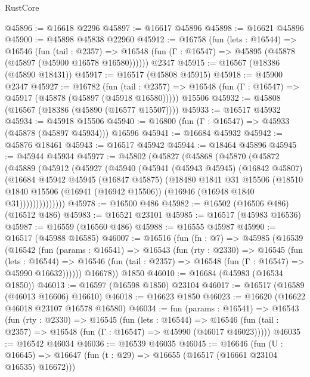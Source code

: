 \begin{lexlean}{RustCore}
\begin{coremodule}
@45896 := @16618 @2296
@45897 := @16617 @45896
@45898 := @16621 @45896
@45900 := @45898 @45838 @22960
@45912 := @16758
    (fun (lets : @16544) =>
    @16546
      (fun (tail : @2357) =>
      @16548 (fun (Γ : @16547) => @45895 (@45878 (@45897 (@45900 @16578 @16580))))))
    @2347
@45915 := @16567 (@18386 (@45890 @18431))
@45917 := @16517 (@45808 @45915)
@45918 := @45900 @2347
@45927 := @16782
    (fun (tail : @2357) => @16548 (fun (Γ : @16547) => @45917 (@45878 (@45897 (@45918 @16580)))))
    @15506
@45932 := @45808 (@16567 (@18386 (@45890 (@16577 @15507))))
@45933 := @16517 @45932
@45934 := @45918 @15506
@45940 := @16800 (fun (Γ : @16547) => @45933 (@45878 (@45897 @45934))) @16596
@45941 := @16684 @45932
@45942 := @45876 @18461
@45943 := @16517 @45942
@45944 := @18464 @45896
@45945 := @45944 @45934
@45977 := @45802
    (@45827
      (@45868
        (@45870
          (@45872
            (@45889
              (@45912
                (@45927
                  (@45940
                    (@45941
                      (@45943 @45945)
                      (@16842 @45807)
                      (@16684
                        @45942
                        @45945
                        (@16847 @45875)
                        (@18480
                          @1841
                          @31
                          @15506
                          (@18510
                            @1840
                            @15506
                            (@16941 (@16942 @15506))
                            (@16946 (@16948 @1840 @31))))))))))))))
@45978 := @16500 @486
@45982 := @16502 (@16506 @486) (@16512 @486)
@45983 := @16521 @23101
@45985 := @16517 (@45983 @16536)
@45987 := @16559 (@16560 @486)
@45988 := @16555 @45987
@45990 := @16517 (@45988 @16585)
@46007 := @16516
    (fun (fn : @7) =>
    @45985
      (@16539
        (@16542
          (fun (params : @16541) =>
          @16543
            (fun (rty : @2330) =>
            @16545
              (fun (lets : @16544) =>
              @16546 (fun (tail : @2357) => @16548 (fun (Γ : @16547) => @45990 @16632))))))
        @16678))
    @1850
@46010 := @16684 (@45983 (@16534 @1850))
@46013 := @16597 (@16598 @1850) @23104
@46017 := @16517 (@16589 (@46013 @16606) @16610)
@46018 := @16623 @1850
@46023 := @16620 (@16622 @46018 @23107 @16578 @16580)
@46034 := fun (params : @16541) =>
  @16543
    (fun (rty : @2330) =>
    @16545
      (fun (lets : @16544) =>
      @16546 (fun (tail : @2357) => @16548 (fun (Γ : @16547) => @45990 (@46017 @46023)))))
@46035 := @16542 @46034
@46036 := @16539 @46035
@46045 := @16646
    (fun (U : @16645) => @16647 (fun (t : @29) => @16655 (@16517 (@16661 @23104 @16535) @16672)))

\end{coremodule}
\end{lexlean}
